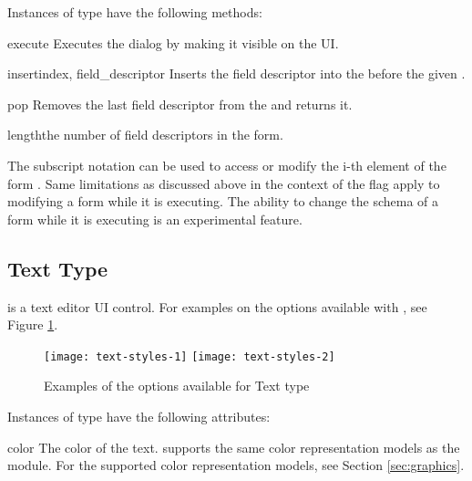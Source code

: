 Instances of  type have the following methods:

\begin{methoddesc}[Form]{execute}{}
Executes the dialog by making it visible on the UI.
\end{methoddesc}

\begin{methoddesc}[Form]{insert}{index, field_descriptor}
Inserts the field descriptor into the  before the given .
\end{methoddesc}

\begin{methoddesc}[Form]{pop}{}
Removes the last field descriptor from the  and returns it.
\end{methoddesc}

\begin{methoddesc}[Form]{length}{}the number of field descriptors in the form.
\end{methoddesc}

The subscript notation  can be used to access or modify the
i-th element of the form . Same limitations as discussed above
in the context of the flag  apply to
modifying a form while it is executing. The ability to change the
schema of a form while it is executing is an experimental feature.

\subsection{Text Type}
\label{subsec:mylabel5}
 is a text editor UI control. For examples on the options 
available with , see Figure \ref{fig:text-styles}.

\begin{figure}[htbp]
\centering
\texttt{[image: text-styles-1]}
\texttt{[image: text-styles-2]}
\caption{Examples of the options available for Text type}
\label{fig:text-styles}
\end{figure}

Instances of  type have the following attributes:

\begin{memberdesc}[Text]{color}
The color of the text.  supports the same color representation 
models as the  module. For the supported color 
representation models, see Section \ref{sec:graphics}.
\end{memberdesc}

